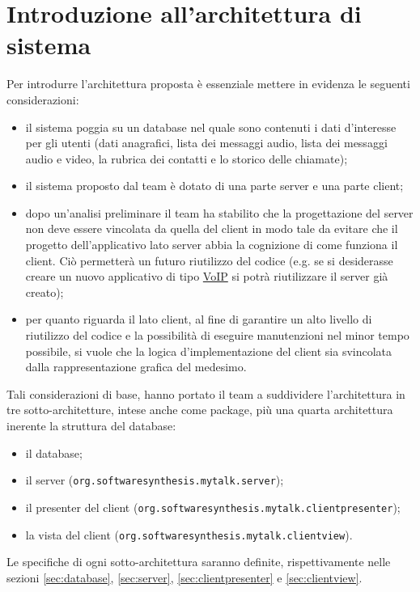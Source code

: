 \section{Introduzione all'architettura di sistema}\label{sec:introdesign}
Per introdurre l'architettura proposta è essenziale mettere in evidenza le seguenti considerazioni:
\begin{itemize}
	\item il sistema poggia su un database nel quale sono contenuti i dati d'interesse per gli utenti (dati anagrafici, lista dei messaggi audio, lista dei messaggi audio e video, la rubrica dei contatti e lo storico delle chiamate);
	\item il sistema proposto dal team è dotato di una parte server e una parte client;
	\item dopo un'analisi preliminare il team ha stabilito che la progettazione del server non deve essere vincolata da quella del client in modo tale da evitare che il progetto dell'applicativo lato server abbia la cognizione di come funziona il client. Ciò permetterà un futuro riutilizzo del codice (e.g. se si desiderasse creare un nuovo applicativo di tipo \underline{VoIP} si potrà riutilizzare il server già creato);
	\item per quanto riguarda il lato client, al fine di garantire un alto livello di riutilizzo del codice e la possibilità di eseguire manutenzioni nel minor tempo possibile, si vuole che la logica d'implementazione del client sia svincolata dalla rappresentazione grafica del medesimo.
\end{itemize}

Tali considerazioni di base, hanno portato il team a suddividere l'architettura in tre sotto-architetture, intese anche come package, più una quarta architettura inerente la struttura del database:
\begin{itemize}
	\item il database;
	\item il server (\texttt{org.softwaresynthesis.mytalk.server});
	\item il presenter del client (\texttt{org.softwaresynthesis.mytalk.clientpresenter});
	\item la vista del client (\texttt{org.softwaresynthesis.mytalk.clientview}).
\end{itemize}

Le specifiche di ogni sotto-architettura saranno definite, rispettivamente nelle sezioni \vref{sec:database}, \vref{sec:server}, \vref{sec:clientpresenter} e \vref{sec:clientview}.

